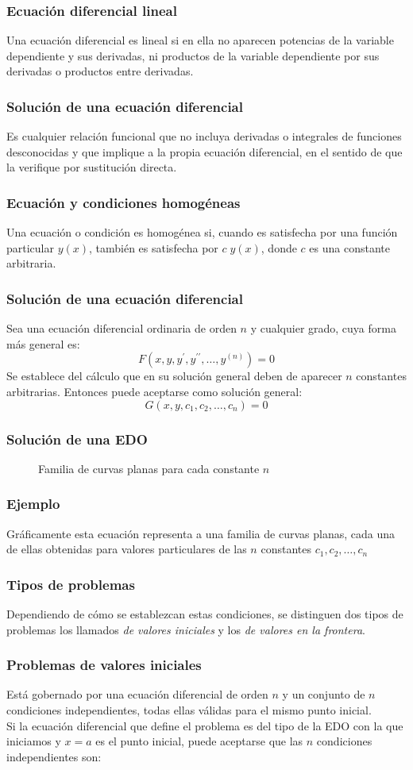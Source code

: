 \begin{frame}
\frametitle{Ecuación diferencial lineal}
Una ecuación diferencial es lineal si en ella no aparecen potencias de la variable dependiente y sus derivadas, ni productos de la variable dependiente por sus derivadas o productos entre derivadas.
\end{frame}
\begin{frame}
\frametitle{Solución de una ecuación diferencial}
Es cualquier relación funcional que no incluya derivadas o integrales de funciones desconocidas y que implique a la propia ecuación diferencial, en el sentido de que la verifique por sustitución directa.
\end{frame}
\begin{frame}
\frametitle{Ecuación y condiciones homogéneas}
Una ecuación o condición es homogénea si, cuando es satisfecha por una función particular $y(x)$, también es satisfecha por $c \; y(x)$, donde $c$ es una constante arbitraria.
\end{frame}
\begin{frame}
\frametitle{Solución de una ecuación diferencial}
Sea una ecuación diferencial ordinaria de orden $n$ y cualquier grado, cuya forma más general es:
\[F(x, y, y^{\prime}, y^{\prime \prime}, \ldots, y^{(n)}) = 0\]
Se establece del cálculo que en su solución general deben de aparecer $n$ constantes arbitrarias. Entonces puede aceptarse como solución general:
\[G(x, y, c_{1}, c_{2}, \ldots, c_{n}) = 0\]
\end{frame}
\begin{frame}[fragile]
\frametitle{Solución de una EDO}
\begin{figure}
	\centering
	
	\caption{Familia de curvas planas para cada constante $n$}
\end{figure}
\end{frame}
\begin{frame}
\frametitle{Ejemplo}
Gráficamente esta ecuación representa a una familia de curvas planas, cada una de ellas obtenidas para valores particulares de las $n$ constantes $c_{1}, c_{2}, \ldots, c_{n}$
\end{frame}
\begin{frame}
\frametitle{Tipos de problemas}
Dependiendo de cómo se establezcan estas condiciones, se distinguen dos tipos de problemas los llamados {\color{red}\textit{de valores iniciales}} y los {\color{red}\textit{de valores en la frontera}}.
\end{frame}
\begin{frame}
\frametitle{Problemas de valores iniciales}
Está gobernado por una ecuación diferencial de orden $n$ y un conjunto de $n$ condiciones independientes, todas ellas válidas para el mismo punto inicial.
\\
\medskip
Si la ecuación diferencial que define el problema es del tipo de la EDO con la que iniciamos y $x=a$ es el punto inicial, puede aceptarse que las $n$ condiciones independientes son:
\end{frame}
